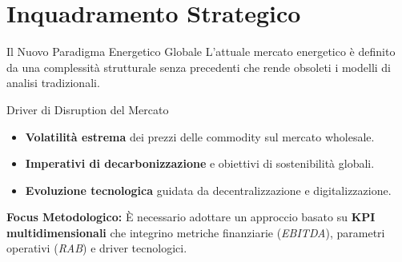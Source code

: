 
\section{Inquadramento Strategico}

\begin{frame}{Il Nuovo Paradigma Energetico Globale}
    L'attuale mercato energetico è definito da una complessità strutturale senza precedenti che rende obsoleti i modelli di analisi tradizionali.
    \vspace{0.3cm}
    
    
    \begin{block}{Driver di Disruption del Mercato}
        \begin{itemize}
            \item \textbf{Volatilità estrema} dei prezzi delle commodity sul mercato wholesale.
            \pause
            
            \item \textbf{Imperativi di decarbonizzazione} e obiettivi di sostenibilità globali.
            \pause
            
            \item \textbf{Evoluzione tecnologica} guidata da decentralizzazione e digitalizzazione.
        \end{itemize}
    \end{block}
    \vspace{0.2cm}
    \pause
    
    \textbf{Focus Metodologico:} È necessario adottare un approccio basato su \textbf{KPI multidimensionali} che integrino metriche finanziarie (\textit{EBITDA}), parametri operativi (\textit{RAB}) e driver tecnologici.
\end{frame}

